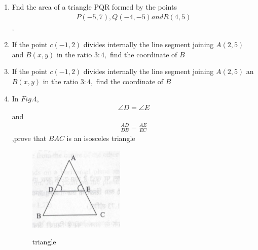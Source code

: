 \documentclass[12pt,-letter paper]{article}
\begin{document}
\begin{enumerate}
	\item Fnd the area of a triangle PQR formed by the points \begin{align}P(-5,7),Q(-4,-5) and R(4,5)\end{align}.
		\item If the point $c(-1,2)$ divides internally the line segment joining $A(2,5)$ and $B(x,y)$ in the ratio $3:4,$ find the coordinate of $B$  
		\item If the point $c(-1,2)$ divides internally the line segment joining $A(2,5)$ an $B(x,y)$ in the ratio $3:4,$ find the coordinate of $B$  
		\item In $Fig.4$, \begin{align}\angle D=\angle E\end{align} and \begin{align}\frac{AD}{DB}=\frac{AE}{EC}\end{align},prove that $BAC$ is an isosceles triangle
\begin{figure}[H]    
\includegraphics[width=\columnwidth]{./imagecharan4.jpg}    
\label{fig:fig1}  
\caption{triangle}  
\end{figure}


\end{enumerate}
\end{document}
